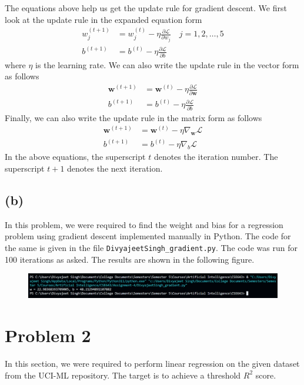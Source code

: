 \documentclass[12pt]{article}
\begin{document}
    The equations above help us get the update rule for gradient descent. We first look at the update rule
    in the expanded equation form
    \begin{align}
        w_{j}^{(t+1)} &= w_{j}^{(t)} - \eta \frac{\partial \mathcal{L}}{\partial w_{j}} \quad j = 1, 2, \ldots, 5 \\
        b^{(t+1)} &= b^{(t)} - \eta \frac{\partial \mathcal{L}}{\partial b}
    \end{align}
    where $\eta$ is the learning rate. We can also write the update rule in the vector form as follows
    \begin{align}
        \mathbf{w}^{(t+1)} &= \mathbf{w}^{(t)} - \eta \frac{\partial \mathcal{L}}{\partial \mathbf{w}} \\
        b^{(t+1)} &= b^{(t)} - \eta \frac{\partial \mathcal{L}}{\partial b}
    \end{align}
    Finally, we can also write the update rule in the matrix form as follows
    \begin{align}
        \mathbf{w}^{(t+1)} &= \mathbf{w}^{(t)} - \eta \nabla_{\mathbf{w}} \mathcal{L} \\
        b^{(t+1)} &= b^{(t)} - \eta \nabla_{b} \mathcal{L}
    \end{align}
    In the above equations, the superscript $t$ denotes the iteration number. The superscript $t+1$ denotes the next iteration.

    \subsection*{(b)}
    In this problem, we were required to find the weight and bias for a regression problem
    using gradient descent implemented manually in Python. The code for the same is given
    in the file \texttt{DivyajeetSingh\_gradient.py}. The code was run for 100 iterations as
    asked. The results are shown in the following figure.
    \begin{figure}[h]
        \centering
        \includegraphics[width=\textwidth]{Assets/Regression.png}
    \end{figure}

    \section*{Problem 2}
    In this section, we were required to perform linear regression on the given dataset
    from the UCI-ML repository. The target is to achieve a threshold $R^{2}$ score.
\end{document}
